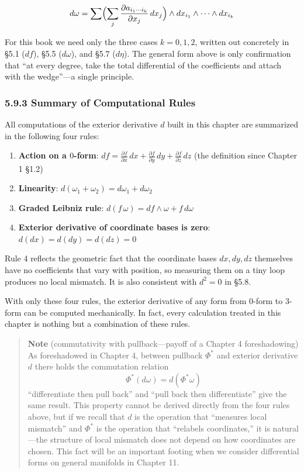 \documentclass[a4paper,12pt,openany]{book}
\providecommand{\tightlist}{%
  \setlength{\itemsep}{0pt}\setlength{\parskip}{0pt}}
\begin{document}
\[d\omega = \sum \Bigl( \sum_j \frac{\partial a_{i_1\cdots i_k}}{\partial x_j}\,dx_j \Bigr) \wedge dx_{i_1}\wedge\cdots\wedge dx_{i_k}\]

For this book we need only the three cases \(k=0,1,2\), written out
concretely in §5.1 (\(df\)), §5.5 (\(d\omega\)), and §5.7 (\(d\eta\)).
The general form above is only confirmation that ``at every degree, take
the total differential of the coefficients and attach with the
wedge''—a single principle.

\hypertarget{summary-of-computational-rules}{%
\subsubsection{5.9.3 Summary of Computational
Rules}\label{summary-of-computational-rules}}

All computations of the exterior derivative \(d\) built in this chapter
are summarized in the following four rules:

\begin{enumerate}
\def\labelenumi{\arabic{enumi}.}
\tightlist
\item
  \textbf{Action on a $0$-form}:
  \(df = \frac{\partial f}{\partial x}\,dx + \frac{\partial f}{\partial y}\,dy + \frac{\partial f}{\partial z}\,dz\)
  (the definition since Chapter 1 §1.2)
\item
  \textbf{Linearity}: \(d(\omega_1 + \omega_2) = d\omega_1 + d\omega_2\)
\item
  \textbf{Graded Leibniz rule}:
  \(d(f\,\omega) = df \wedge \omega + f\,d\omega\)
\item
  \textbf{Exterior derivative of coordinate bases is zero}:
  \(d(dx) = d(dy) = d(dz) = 0\)
\end{enumerate}

Rule 4 reflects the geometric fact that the coordinate bases
\(dx, dy, dz\) themselves have no coefficients that vary with position,
so measuring them on a tiny loop produces no local mismatch. It is also
consistent with \(d^2=0\) in §5.8.

With only these four rules, the exterior derivative of any form from
\(0\)-form to \(3\)-form can be computed mechanically. In fact, every
calculation treated in this chapter is nothing but a combination of
these rules.

\begin{quote}
\textbf{Note} (commutativity with pullback—payoff of a Chapter 4
foreshadowing) As foreshadowed in Chapter 4, between pullback \(\Phi^*\)
and exterior derivative \(d\) there holds the commutation relation
\[\Phi^*(d\omega) = d(\Phi^*\omega)\] ``differentiate then pull back''
and ``pull back then differentiate'' give the same result. This property
cannot be derived directly from the four rules above, but if we recall
that \(d\) is the operation that ``measures local mismatch'' and
\(\Phi^*\) is the operation that ``relabels coordinates,'' it is
natural—the structure of local mismatch does not depend on how
coordinates are chosen. This fact will be an important footing when we
consider differential forms on general manifolds in Chapter 11.
\end{quote}
\end{document}
